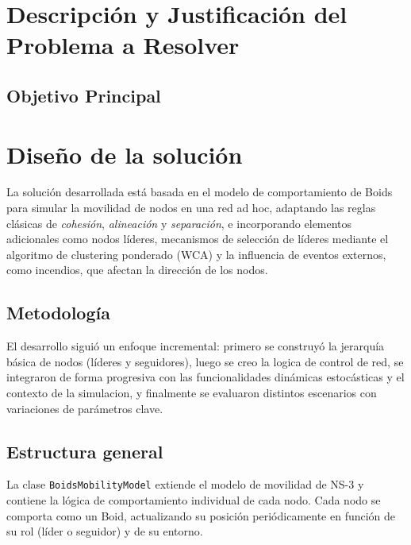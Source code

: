 \documentclass{article}
\begin{document}
\section{Descripción y Justificación del Problema a Resolver}\label{sec:descr}


\subsection{Objetivo Principal}




\section{Diseño de la solución}

La solución desarrollada está basada en el modelo de comportamiento de Boids para simular la movilidad de nodos en una red ad hoc, adaptando las reglas clásicas de \textit{cohesión}, \textit{alineación} y \textit{separación}, e incorporando elementos adicionales como nodos líderes, mecanismos de selección de líderes mediante el algoritmo de clustering ponderado (WCA) y la influencia de eventos externos, como incendios, que afectan la dirección de los nodos.

\subsection{Metodología}

El desarrollo siguió un enfoque incremental: primero se construyó la jerarquía básica de nodos (líderes y seguidores), luego se creo la logica de control de red, se integraron de forma progresiva con las funcionalidades dinámicas estocásticas y el contexto de la simulacion, y finalmente se evaluaron distintos escenarios con variaciones de parámetros clave.

\subsection{Estructura general}

La clase \texttt{BoidsMobilityModel} extiende el modelo de movilidad de NS-3 y contiene la lógica de comportamiento individual de cada nodo. Cada nodo se comporta como un Boid, actualizando su posición periódicamente en función de su rol (líder o seguidor) y de su entorno.
\end{document}
